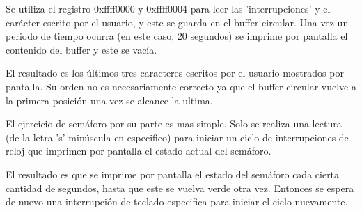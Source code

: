 \documentclass[titlepage]{article}
\begin{document}
Se utiliza el registro 0xffff0000 y 0xffff0004 para leer las 'interrupciones' y el carácter escrito por el usuario, y este se guarda en el buffer circular. Una vez un periodo de tiempo ocurra (en este caso, 20 segundos) se imprime por pantalla el contenido del buffer y este se vacía.

El resultado es los últimos tres caracteres escritos por el usuario mostrados por pantalla. Su orden no es necesariamente correcto ya que el buffer circular vuelve a la primera posición una vez se alcance la ultima.

El ejercicio de semáforo por su parte es mas simple. Solo se realiza una lectura (de la letra 's' minúscula en especifico) para iniciar un ciclo de interrupciones de reloj que imprimen por pantalla el estado actual del semáforo.

El resultado es que se imprime por pantalla el estado del semáforo cada cierta cantidad de segundos, hasta que este se vuelva verde otra vez. Entonces se espera de nuevo una interrupción de teclado especifica para iniciar el ciclo nuevamente.
\end{document}
